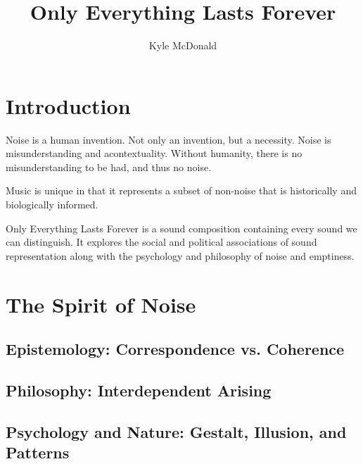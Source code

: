 \documentclass{thesis}
\title{Only Everything Lasts Forever}
\author{Kyle McDonald}
\begin{document}
\maketitle

\chapter{Introduction}

Noise is a human invention. Not only an invention, but a necessity. Noise is misunderstanding and acontextuality. Without humanity, there is no misunderstanding to be had, and thus no noise.

Music is unique in that it represents a subset of non-noise that is historically and biologically informed.

Only Everything Lasts Forever is a sound composition containing every sound we can distinguish. It explores the social and political associations of sound representation along with the psychology and philosophy of noise and emptiness.

\chapter{The Spirit of Noise}
\section{Epistemology: Correspondence vs. Coherence}
	\cite{Blackburn07}\cite{seti_about_????}\cite{david_correspondence_????}\cite{david_horvitz_flickr:_????}
	\cite{david_horvitz_flickr:_????-1}\cite{young_coherence_????}
\section{Philosophy: Interdependent Arising}
	\cite{Hofstadter07}\cite{Koller01}\cite{erik_thiele_tempest_????}\cite{francesco_vianello_reality_????}
	\cite{w._wayt_gibbs_hackers_2009}
\section{Psychology and Nature: Gestalt, Illusion, and Patterns}
	\cite{Moore07}\cite{Doczi81}\cite{Hofstadter01}\cite{robin_mckie_secret_2004}
	\cite{alan_dunning_paul_woodrow_and_morley_hollenberg_einsteins_2008}\cite{alexander_bogomolny_kanizsa_????}
	\cite{brian_dunning_facemars_2008}\cite{dan_paluska_holy_2005}\cite{de_lapparent_slice_1986}
	\cite{jochem_van_der_spek_no_2001}\cite{jonathan_feinberg_haiku_????}\cite{michael_bach_dalmatian_2002}
	\cite{michael_m._ross_natural_2007}\cite{padovan_proportion_1999}\cite{rips_equidistant_1994}
	\cite{weisstein_prime_????}\cite{boston.com_religious_????}
\end{document}
